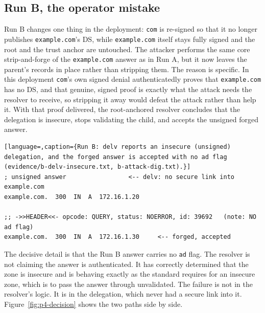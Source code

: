 \documentclass[11pt]{article}
\begin{document}
\subsection{Run B, the operator mistake}

Run B changes one thing in the deployment: \texttt{com} is re-signed so that it no
longer publishes \texttt{example.com}'s DS, while \texttt{example.com} itself stays
fully signed and the root and the trust anchor are untouched. The attacker performs
the same core strip-and-forge of the \texttt{example.com} answer as in Run A, but it
now leaves the parent's records in place rather than stripping them. The reason is
specific. In this deployment \texttt{com}'s own signed denial authenticatedly proves
that \texttt{example.com} has no DS, and that genuine, signed proof is exactly what
the attack needs the resolver to receive, so stripping it away would defeat the
attack rather than help it. With that proof delivered, the root-anchored resolver
concludes that the delegation is insecure, stops validating the child, and accepts
the unsigned forged answer.

\begin{lstlisting}[language=,caption={Run B: delv reports an insecure (unsigned) delegation, and the forged answer is accepted with no ad flag (evidence/b-delv-insecure.txt, b-attack-dig.txt).}]
; unsigned answer                 <-- delv: no secure link into example.com
example.com.  300  IN  A  172.16.1.20

;; ->>HEADER<<- opcode: QUERY, status: NOERROR, id: 39692   (note: NO ad flag)
example.com.  300  IN  A  172.16.1.30     <-- forged, accepted
\end{lstlisting}

The decisive detail is that the Run B answer carries no \texttt{ad} flag. The
resolver is not claiming the answer is authenticated. It has correctly determined
that the zone is insecure and is behaving exactly as the standard requires for an
insecure zone, which is to pass the answer through unvalidated. The failure is not
in the resolver's logic. It is in the delegation, which never had a secure link
into it. Figure~\ref{fig:p4-decision} shows the two paths side by side.

\end{document}
